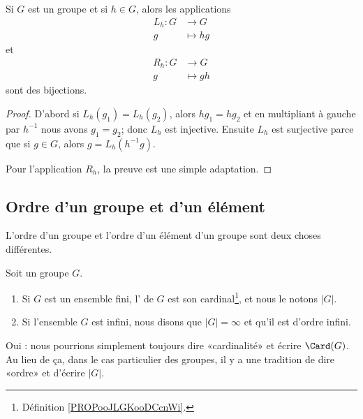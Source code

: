 \begin{lemma}       \label{LEMooBIBFooBHxFYC}
	Si \( G\) est un groupe et si \( h\in G\), alors les applications
	\begin{equation}
		\begin{aligned}
			L_h\colon G & \to G      \\
			g           & \mapsto hg
		\end{aligned}
	\end{equation}
	et
	\begin{equation}
		\begin{aligned}
			R_h\colon G & \to G      \\
			g           & \mapsto gh
		\end{aligned}
	\end{equation}
	sont des bijections.
\end{lemma}

\begin{proof}
	D'abord si \( L_h(g_1)=L_h(g_2)\), alors \( hg_1=hg_2\) et en multipliant à gauche par \( h^{-1}\) nous avons \( g_1=g_2\); donc \( L_h\) est injective. Ensuite \( L_h\) est surjective parce que si \( g\in G\), alors \( g=L_h(h^{-1} g)\).

	Pour l'application \( R_h\), la preuve est une simple adaptation.
\end{proof}


\subsection{Ordre d'un groupe et d'un élément}


L'ordre d'un groupe et l'ordre d'un élément d'un groupe sont deux choses différentes.

\begin{definition}    \label{DEFooKWBCooMlmpCP}
	Soit un groupe \( G\).
	\begin{enumerate}
		\item
		      Si \( G\) est un ensemble fini, l' de \( G\) est son cardinal\footnote{Définition \ref{PROPooJLGKooDCcnWi}.}, et nous le notons \( | G |\).
		\item
		      Si l'ensemble \( G\) est infini, nous disons que \( | G |=\infty\) et qu'il est d'ordre infini.
	\end{enumerate}
	Oui : nous pourrions simplement toujours dire «cardinalité» et écrire \( \Card(G)\). Au lieu de ça, dans le cas particulier des groupes, il y a une tradition de dire «ordre» et d'écrire \( | G |\).
\end{definition}

